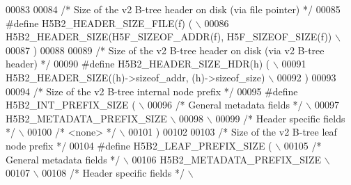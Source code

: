 \begin{DoxyCode}
{{00083 
00084 \textcolor{comment}{/* Size of the v2 B-tree header on disk (via file pointer) */}
00085 \textcolor{preprocessor}{#define H5B2\_HEADER\_SIZE\_FILE(f)   (                                          \(\backslash\)}
00086 \textcolor{preprocessor}{    H5B2\_HEADER\_SIZE(H5F\_SIZEOF\_ADDR(f), H5F\_SIZEOF\_SIZE(f))                  \(\backslash\)}
00087 \textcolor{preprocessor}{    )}
00088 
00089 \textcolor{comment}{/* Size of the v2 B-tree header on disk (via v2 B-tree header) */}
00090 \textcolor{preprocessor}{#define H5B2\_HEADER\_SIZE\_HDR(h)   (                                           \(\backslash\)}
00091 \textcolor{preprocessor}{    H5B2\_HEADER\_SIZE((h)->sizeof\_addr, (h)->sizeof\_size)                      \(\backslash\)}
00092 \textcolor{preprocessor}{    )}
00093 
00094 \textcolor{comment}{/* Size of the v2 B-tree internal node prefix */}
00095 \textcolor{preprocessor}{#define H5B2\_INT\_PREFIX\_SIZE (                                                \(\backslash\)}
00096 \textcolor{preprocessor}{    }\textcolor{comment}{/* General metadata fields */}\textcolor{preprocessor}{                                             \(\backslash\)}
00097 \textcolor{preprocessor}{    H5B2\_METADATA\_PREFIX\_SIZE                                                 \(\backslash\)}
00098 \textcolor{preprocessor}{                                                                              \(\backslash\)}
00099 \textcolor{preprocessor}{    }\textcolor{comment}{/* Header specific fields */}\textcolor{preprocessor}{                                              \(\backslash\)}
00100 \textcolor{preprocessor}{    }\textcolor{comment}{/* <none> */}\textcolor{preprocessor}{                                                              \(\backslash\)}
00101 \textcolor{preprocessor}{    )}
00102 
00103 \textcolor{comment}{/* Size of the v2 B-tree leaf node prefix */}
00104 \textcolor{preprocessor}{#define H5B2\_LEAF\_PREFIX\_SIZE (                                               \(\backslash\)}
00105 \textcolor{preprocessor}{    }\textcolor{comment}{/* General metadata fields */}\textcolor{preprocessor}{                                             \(\backslash\)}
00106 \textcolor{preprocessor}{    H5B2\_METADATA\_PREFIX\_SIZE                                                 \(\backslash\)}
00107 \textcolor{preprocessor}{                                                                              \(\backslash\)}
00108 \textcolor{preprocessor}{    }\textcolor{comment}{/* Header specific fields */}\textcolor{preprocessor}{                                              \(\backslash\)}
}}
\end{DoxyCode}
